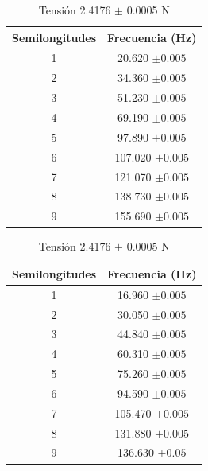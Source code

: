\documentclass[10pt,a4paper]{article}
\begin{document}
\begin{table}[H]
    \centering
\begin{minipage}[t]{0.48\linewidth}\centering
\caption{Tensión 3.1765 $\pm$ 0.0005 N}
\begin{tabular}{ c c }
\toprule
Semilongitudes &Frecuencia (Hz)      \\
\midrule
1 & 20.620 $\pm0.005$      \\
2& 34.360 $\pm0.005$     \\
3& 51.230 $\pm0.005$     \\
4& 69.190 $\pm0.005$     \\
5& 97.890 $\pm0.005$     \\
6&107.020 $\pm0.005$     \\
7&121.070 $\pm0.005$     \\
8&138.730 $\pm0.005$     \\
9&155.690 $\pm0.005$     \\
\bottomrule
\end{tabular}
\end{minipage}\hfill%
\begin{minipage}[t]{0.48\linewidth}\centering
\caption{Tensión 2.4176 $\pm$ 0.0005 N}
\label{tab:The parameters 2 }
\begin{tabular}{ c c }
\toprule
Semilongitudes &Frecuencia (Hz)      \\
\midrule

1 & 16.960 $\pm0.005$      \\
2& 30.050 $\pm0.005$     \\
3& 44.840 $\pm0.005$     \\
4& 60.310 $\pm0.005$     \\
5& 75.260 $\pm0.005$     \\
6& 94.590 $\pm0.005$     \\
7&105.470 $\pm0.005$     \\
8&131.880 $\pm0.005$     \\
9 & 136.630 $\pm0.05$ \\
\bottomrule
\end{tabular}
\end{minipage}
\end{table}
\end{document}
